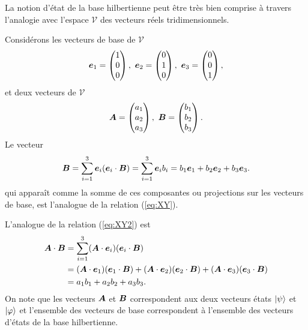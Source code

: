 La notion d'état de la base hilbertienne peut être très bien comprise à
travers l'analogie avec l'espace $\mathcal{V}$ des vecteurs réels
tridimensionnels.

Considérons les vecteurs de base de $\mathcal{V}$%
\begin{equation}
\boldsymbol{e}_1=\begin{pmatrix}
1\\
0\\
0
\end{pmatrix},\ \boldsymbol{e}_2=\begin{pmatrix}
0\\
1\\
0
\end{pmatrix},\ \boldsymbol{e}_{3}=\begin{pmatrix}
0\\
0\\
1
\end{pmatrix},
\end{equation}
et deux vecteurs de $\mathcal{V}$%
\begin{equation}
\boldsymbol{A}=\begin{pmatrix}
a_1\\
a_2\\
a_{3}\end{pmatrix},\ \boldsymbol{B}=\begin{pmatrix}
b_1\\
b_2\\
b_{3}\end{pmatrix}.
\end{equation}
Le vecteur
\begin{equation}
\bls{B}=\sum_{i=1}^{3}\bls{e}_{i}(\bls{e}_{i}
\cdot\bls{B})=\sum_{i=1}^{3}\bls{e}_{i}b_{i}=
b_1\bls{e}_1+b_2\bls{e}_2+b_{3}\bls{e}_{3}.
\label{eq:B}%
\end{equation}
qui apparaît comme la somme de ces composantes ou projections sur les vecteurs
de base, est l'analogue de la relation (\ref{eq:XY}).

L'analogue de la relation (\ref{eq:XY2}) est
\begin{equation}%
\begin{split}
\bls{A}\cdot\bls{B}  &  =\sum_{i=1}^{3}(\bls{A}\cdot\bls{e}_{i})
(\bls{e}_{i}\cdot\bls{B})\\
& =(\bls{A}\cdot\bls{e}_1)(\bls{e}_1\cdot\bls{B})
+(\bls{A}\cdot\bls{e}_2)(\bls{e}_2\cdot\bls{B})
+(\bls{A}\cdot\bls{e}_{3})(\bls{e}_{3}\cdot\bls{B})
\\
&  =a_1b_1+a_2b_2+a_{3}b_{3}.
\label{eq:AB2}%
\end{split}%
\end{equation}%
On note que les vecteurs $\boldsymbol{A}$ et $\boldsymbol{B}$ correspondent aux deux vecteurs
états $\vert\psi\rangle $ et $\vert\varphi\rangle $ et l'ensemble des vecteurs de base
correspondent à l'ensemble des vecteurs d'états de la base hilbertienne.

